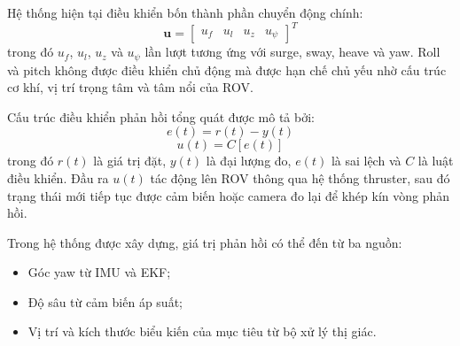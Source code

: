 \documentclass[../DoAn.tex]{subfiles}
\begin{document}
Hệ thống hiện tại điều khiển bốn thành phần chuyển động chính:
\[
\mathbf{u} = 
\begin{bmatrix}
u_f & u_l & u_z & u_\psi
\end{bmatrix}^{T}
\]
trong đó $u_f$, $u_l$, $u_z$ và $u_\psi$ lần lượt tương ứng với surge, sway, heave và yaw. Roll và pitch không được điều khiển chủ động mà được hạn chế chủ yếu nhờ cấu trúc cơ khí, vị trí trọng tâm và tâm nổi của ROV.

Cấu trúc điều khiển phản hồi tổng quát được mô tả bởi:
\[
e(t) = r(t) - y(t)
\]
\[
u(t) = C\left[e(t)\right]
\]
trong đó $r(t)$ là giá trị đặt, $y(t)$ là đại lượng đo, $e(t)$ là sai lệch và $C$ là luật điều khiển. Đầu ra $u(t)$ tác động lên ROV thông qua hệ thống thruster, sau đó trạng thái mới tiếp tục được cảm biến hoặc camera đo lại để khép kín vòng phản hồi.

Trong hệ thống được xây dựng, giá trị phản hồi có thể đến từ ba nguồn:
\begin{itemize}
    \item Góc yaw từ IMU và EKF;
    \item Độ sâu từ cảm biến áp suất;
    \item Vị trí và kích thước biểu kiến của mục tiêu từ bộ xử lý thị giác.
\end{itemize}
\end{document}
